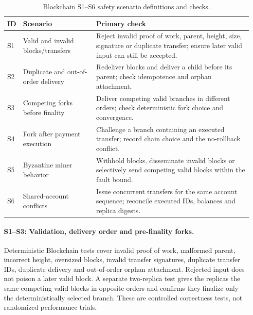 \documentclass[sigconf,a4paper]{acmart}
\begin{document}
    \begin{table}[t]
        \centering
        \small
        \caption{Blockchain S1--S6 safety scenario definitions and checks.}
        \label{tab:blockchain-s-scenarios}
        \begin{tabular}{p{0.9cm}p{4.0cm}p{9.8cm}}
            \toprule
            \textbf{ID} & \textbf{Scenario} & \textbf{Primary check} \\
            \midrule
            S1 & Valid and invalid blocks/transfers & Reject invalid proof of work, parent, height, size, signature or duplicate transfer; ensure later valid input can still be accepted. \\
            S2 & Duplicate and out-of-order delivery & Redeliver blocks and deliver a child before its parent; check idempotence and orphan attachment. \\
            S3 & Competing forks before finality & Deliver competing valid branches in different orders; check deterministic fork choice and convergence. \\
            S4 & Fork after payment execution & Challenge a branch containing an executed transfer; record chain choice and the no-rollback conflict. \\
            S5 & Byzantine miner behavior & Withhold blocks, disseminate invalid blocks or selectively send competing valid blocks within the fault bound. \\
            S6 & Shared-account conflicts & Issue concurrent transfers for the same account sequence; reconcile executed IDs, balances and replica digests. \\
            \bottomrule
        \end{tabular}
    \end{table}

    \paragraph{S1--S3: Validation, delivery order and pre-finality forks.}
    Deterministic Blockchain tests cover invalid proof of work, malformed
    parent, incorrect height, oversized blocks, invalid transfer signatures,
    duplicate transfer IDs, duplicate delivery and out-of-order orphan
    attachment. Rejected input does not poison a later valid block. A separate
    two-replica test gives the replicas the same competing valid blocks in
    opposite orders and confirms they finalize only the deterministically
    selected branch. These are controlled correctness tests, not randomized
    performance trials.
\end{document}
